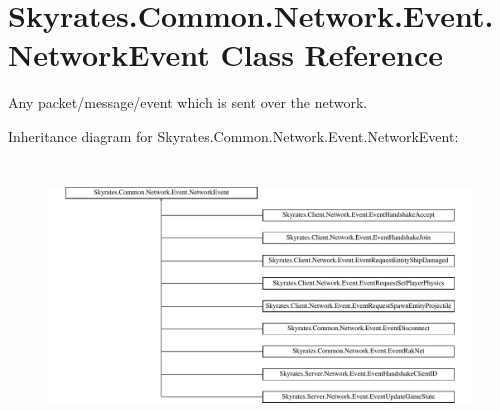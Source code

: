 \hypertarget{class_skyrates_1_1_common_1_1_network_1_1_event_1_1_network_event}{\section{Skyrates.\-Common.\-Network.\-Event.\-Network\-Event Class Reference}
\label{class_skyrates_1_1_common_1_1_network_1_1_event_1_1_network_event}
}


Any packet/message/event which is sent over the network.  


Inheritance diagram for Skyrates.\-Common.\-Network.\-Event.\-Network\-Event\-:\begin{figure}[H]
\begin{center}
\leavevmode
\includegraphics[height=7.124682cm]{class_skyrates_1_1_common_1_1_network_1_1_event_1_1_network_event}
\end{center}
\end{figure}
